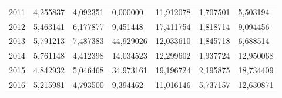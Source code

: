 \begin{table}
\begin{tabular}{p{1cm}p{2cm}p{2cm}p{2cm}p{2cm}p{2cm}p{2cm}}
 2011 &        4,255837 &                        4,092351 &                 0,000000 &         11,912078 &                                  1,707501 &  5,503194 \\
 2012 &        5,463141 &                        6,177877 &                 9,451448 &         17,411754 &                                  1,818714 &  9,094456 \\
 2013 &        5,791213 &                        7,487383 &                44,929026 &         12,033610 &                                  1,845718 &  6,688514 \\
 2014 &        5,761148 &                        4,412398 &                14,034523 &         12,299602 &                                  1,937724 & 12,950068 \\
 2015 &        4,842932 &                        5,046468 &                34,973161 &         19,196724 &                                  2,195875 & 18,734409 \\
 2016 &        5,215981 &                        4,793500 &                 9,394462 &         11,016146 &                                  5,737157 & 12,630871 \\
\bottomrule
\end{tabular}
\end{table}
